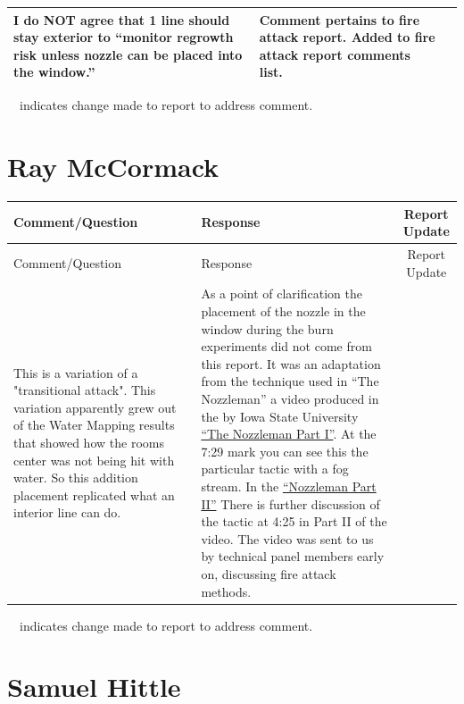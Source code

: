\documentclass[12pt,oneside]{book}
\begin{document}
\begin{landscape}
\begin{longtable}{|L{4in}|L{3.75in}|c|}
 		\hline
 		I do NOT agree that 1 line should stay exterior to ``monitor regrowth risk unless nozzle can be placed into the window.'' &
 		Comment pertains to fire attack report. Added to fire attack report comments list. & \\

 		\hline
\end{longtable}
\checkmark~~indicates change made to report to address comment.

\newpage

\section{Ray McCormack}
\begin{longtable}{|L{4in}|L{3.75in}|c|}

		\hline
		Comment/Question & Response & Report Update \\ 
		\toprule[1.0pt] \endfirsthead
		\hline
		Comment/Question & Response & Report Update \\ 
		\toprule[1.0pt] \endhead
		\hline
		This is a variation of a "transitional attack". This variation apparently grew out of the Water Mapping results that showed how the rooms center was not being hit with water. So this addition placement replicated what an interior line can do. &
		As a point of clarification the placement of the nozzle in the window during the burn experiments did not come from this report. It was an adaptation from the technique used in ``The Nozzleman'' a video produced in the by Iowa State University \href{https://www.youtube.com/watch?v=cBd9i2bQmaQ&t=449}{``The Nozzleman Part I''}. At the 7:29 mark you can see this the particular tactic with a fog stream. In the \href{https://www.youtube.com/watch?v=hbMWNf9Eq7c&t=265s}{``Nozzleman Part II''} There is further discussion of the tactic at 4:25 in Part II of the video. The video was sent to us by technical panel members early on, discussing fire attack methods. & \\
		\hline

\end{longtable}
\checkmark~~indicates change made to report to address comment.

\newpage

\section{Samuel Hittle}
\begin{longtable}{|L{4in}|L{3.75in}|c|}


\end{longtable}
\end{landscape}
\end{document}
